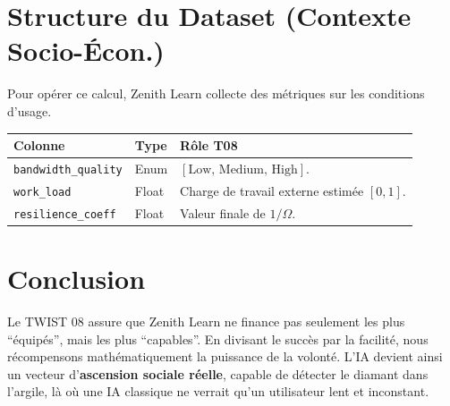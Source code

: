 \documentclass[11pt,a4paper]{article}
\begin{document}
\section{Structure du Dataset (Contexte Socio-Écon.)}
Pour opérer ce calcul, Zenith Learn collecte des métriques sur les conditions d'usage.
\begin{table}[h!]
\centering
\begin{tabular}{|l|l|p{7cm}|}
\hline
\rowcolor{BrandDark} \color{white} Colonne & \color{white} Type & \color{white} Rôle T08 \\ \hline
\texttt{bandwidth\_quality} & Enum & $[\text{Low, Medium, High}]$. \\ \hline
\rowcolor{BrandPrimary!20} \texttt{work\_load} & Float & Charge de travail externe estimée $[0, 1]$. \\ \hline
\texttt{resilience\_coeff} & Float & Valeur finale de $1/\Omega$. \\ \hline
\end{tabular}
\end{table}

\section{Conclusion}
Le TWIST 08 assure que Zenith Learn ne finance pas seulement les plus ``équipés'', mais les plus ``capables''. En divisant le succès par la facilité, nous récompensons mathématiquement la puissance de la volonté. L'IA devient ainsi un vecteur d'\textbf{ascension sociale réelle}, capable de détecter le diamant dans l'argile, là où une IA classique ne verrait qu'un utilisateur lent et inconstant.
\end{document}
